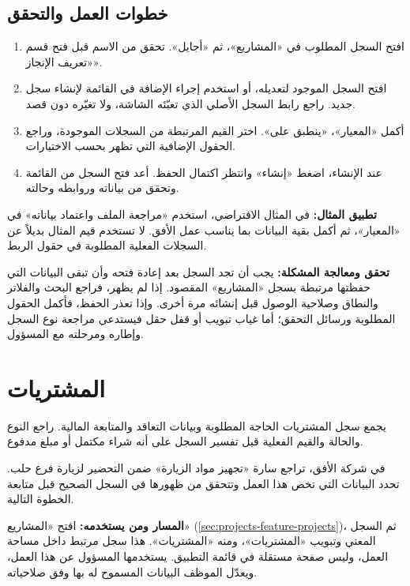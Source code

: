 \subsection{خطوات العمل والتحقق}
\begin{enumerate}
\item افتح السجل المطلوب في «المشاريع»، ثم «أجايل». تحقق من الاسم قبل فتح قسم «تعريف الإنجاز».
\item افتح السجل الموجود لتعديله، أو استخدم إجراء الإضافة في القائمة لإنشاء سجل جديد. راجع رابط السجل الأصلي الذي تعبّئه الشاشة، ولا تغيّره دون قصد.
\item أكمل «المعيار»، «ينطبق على». اختر القيم المرتبطة من السجلات الموجودة، وراجع الحقول الإضافية التي تظهر بحسب الاختيارات.
\item عند الإنشاء، اضغط «إنشاء» وانتظر اكتمال الحفظ. أعد فتح السجل من القائمة وتحقق من بياناته وروابطه وحالته.
\end{enumerate}

\textbf{تطبيق المثال:} في المثال الافتراضي، استخدم «مراجعة الملف واعتماد بياناته» في «المعيار»، ثم أكمل بقية البيانات بما يناسب عمل الأفق. لا تستخدم قيم المثال بديلاً عن السجلات الفعلية المطلوبة في حقول الربط.

\textbf{تحقق ومعالجة المشكلة:} يجب أن تجد السجل بعد إعادة فتحه وأن تبقى البيانات التي حفظتها مرتبطة بسجل «المشاريع» المقصود. إذا لم يظهر، فراجع البحث والفلاتر والنطاق وصلاحية الوصول قبل إنشائه مرة أخرى. وإذا تعذر الحفظ، فأكمل الحقول المطلوبة ورسائل التحقق؛ أما غياب تبويب أو قفل حقل فيستدعي مراجعة نوع السجل وإطاره ومرحلته مع المسؤول.

\clearpage
\section{المشتريات}
\label{sec:projects-feature-procurements}

يجمع سجل المشتريات الحاجة المطلوبة وبيانات التعاقد والمتابعة المالية. راجع النوع والحالة والقيم الفعلية قبل تفسير السجل على أنه شراء مكتمل أو مبلغ مدفوع.

\begin{rcnote}
في شركة الأفق، تراجع سارة «تجهيز مواد الزيارة» ضمن التحضير لزيارة فرع حلب. تحدد البيانات التي تخص هذا العمل وتتحقق من ظهورها في السجل الصحيح قبل متابعة الخطوة التالية.
\end{rcnote}

\textbf{المسار ومن يستخدمه:} افتح «المشاريع» (\ref{sec:projects-feature-projects})، ثم السجل المعني وتبويب «المشتريات»، ومنه «المشتريات». هذا سجل مرتبط داخل مساحة العمل، وليس صفحة مستقلة في قائمة التطبيق. يستخدمها المسؤول عن هذا العمل، ويعدّل الموظف البيانات المسموح له بها وفق صلاحياته.

